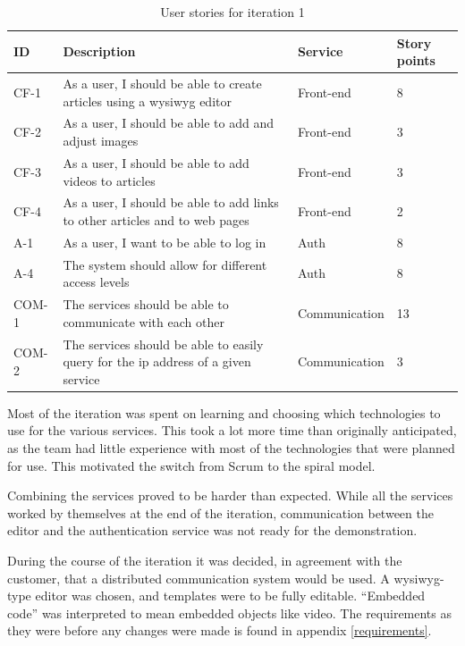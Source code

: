 \begin{table}[H]
   \caption{User stories for iteration 1 }
   \centering
   \label{tab:iter1_stories}
   \begin{tabular}{|p{1.3cm}|p{6cm}|p{3cm}|p{2.5cm}|}\hline%
        ID & Description & Service & Story points\\\hline\hline
        
        CF-1 & As a user, I should be able to create articles using a \acrshort{wysiwyg} editor & Front-end & 8 \\ \hline
        CF-2 & As a user, I should be able to add and adjust images & Front-end & 3 \\ \hline
        CF-3 & As a user, I should be able to add videos to articles & Front-end & 3 \\ \hline
        CF-4 & As a user, I should be able to add links to other articles and to web pages & Front-end & 2 \\ \hline
		A-1 & As a user, I want to be able to log in & Auth & 8 \\ \hline
        A-4 & The system should allow for different access levels & Auth & 8 \\ \hline
        COM-1 & The services should be able to communicate with each other & Communication & 13 \\ \hline
        COM-2 & The services should be able to easily query for the \acrshort{ip} address of a given service & Communication & 3 \\ \hline
    \end{tabular}
\end{table}

Most of the iteration was spent on learning and choosing which technologies to use for the various services. This took a lot more time than originally anticipated, as the team had little experience with most of the technologies that were planned for use. This motivated the switch from Scrum to the spiral model.

Combining the services proved to be harder than expected.
While all the services worked by themselves at the end of the iteration, communication between the editor and the authentication service was not ready for the demonstration.

During the course of the iteration it was decided, in agreement with the customer, that a distributed communication system would be used. A \acrshort{wysiwyg}-type editor was chosen, and templates were to be fully editable. ``Embedded code'' was interpreted to mean embedded objects like video.
The requirements as they were before any changes were made is found in appendix \ref{requirements}.

